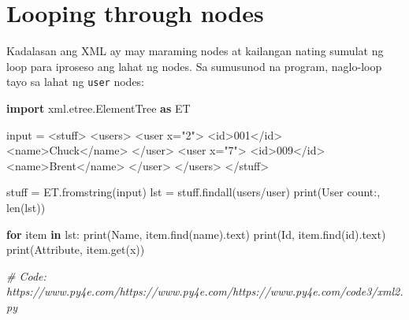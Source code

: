 \documentclass[10pt,]{book}
\newenvironment{Shaded}{}{}
\newcommand{\BuiltInTok}[1]{\textcolor[rgb]{0.00,0.50,0.00}{#1}}
\newcommand{\CommentTok}[1]{\textcolor[rgb]{0.38,0.63,0.69}{\textit{#1}}}
\newcommand{\ControlFlowTok}[1]{\textcolor[rgb]{0.00,0.44,0.13}{\textbf{#1}}}
\newcommand{\ImportTok}[1]{\textcolor[rgb]{0.00,0.50,0.00}{\textbf{#1}}}
\newcommand{\KeywordTok}[1]{\textcolor[rgb]{0.00,0.44,0.13}{\textbf{#1}}}
\newcommand{\NormalTok}[1]{#1}
\newcommand{\OperatorTok}[1]{\textcolor[rgb]{0.40,0.40,0.40}{#1}}
\newcommand{\StringTok}[1]{\textcolor[rgb]{0.25,0.44,0.63}{#1}}
\begin{document}
\section{Looping through nodes}\label{looping-through-nodes}

 

Kadalasan ang XML ay may maraming nodes at kailangan nating sumulat ng
loop para iproseso ang lahat ng nodes. Sa sumusunod na program,
naglo-loop tayo sa lahat ng \texttt{user} nodes:

\begin{Shaded}
\begin{Highlighting}[]
\ImportTok{import}\NormalTok{ xml.etree.ElementTree }\ImportTok{as}\NormalTok{ ET}

\BuiltInTok{input} \OperatorTok{=} \StringTok{\textquotesingle{}\textquotesingle{}\textquotesingle{}}
\StringTok{\textless{}stuff\textgreater{}}
\StringTok{  \textless{}users\textgreater{}}
\StringTok{    \textless{}user x="2"\textgreater{}}
\StringTok{      \textless{}id\textgreater{}001\textless{}/id\textgreater{}}
\StringTok{      \textless{}name\textgreater{}Chuck\textless{}/name\textgreater{}}
\StringTok{    \textless{}/user\textgreater{}}
\StringTok{    \textless{}user x="7"\textgreater{}}
\StringTok{      \textless{}id\textgreater{}009\textless{}/id\textgreater{}}
\StringTok{      \textless{}name\textgreater{}Brent\textless{}/name\textgreater{}}
\StringTok{    \textless{}/user\textgreater{}}
\StringTok{  \textless{}/users\textgreater{}}
\StringTok{\textless{}/stuff\textgreater{}\textquotesingle{}\textquotesingle{}\textquotesingle{}}

\NormalTok{stuff }\OperatorTok{=}\NormalTok{ ET.fromstring(}\BuiltInTok{input}\NormalTok{)}
\NormalTok{lst }\OperatorTok{=}\NormalTok{ stuff.findall(}\StringTok{\textquotesingle{}users/user\textquotesingle{}}\NormalTok{)}
\BuiltInTok{print}\NormalTok{(}\StringTok{\textquotesingle{}User count:\textquotesingle{}}\NormalTok{, }\BuiltInTok{len}\NormalTok{(lst))}

\ControlFlowTok{for}\NormalTok{ item }\KeywordTok{in}\NormalTok{ lst:}
    \BuiltInTok{print}\NormalTok{(}\StringTok{\textquotesingle{}Name\textquotesingle{}}\NormalTok{, item.find(}\StringTok{\textquotesingle{}name\textquotesingle{}}\NormalTok{).text)}
    \BuiltInTok{print}\NormalTok{(}\StringTok{\textquotesingle{}Id\textquotesingle{}}\NormalTok{, item.find(}\StringTok{\textquotesingle{}id\textquotesingle{}}\NormalTok{).text)}
    \BuiltInTok{print}\NormalTok{(}\StringTok{\textquotesingle{}Attribute\textquotesingle{}}\NormalTok{, item.get(}\StringTok{\textquotesingle{}x\textquotesingle{}}\NormalTok{))}

\CommentTok{\# Code: https://www.py4e.com/https://www.py4e.com/https://www.py4e.com/code3/xml2.py}
\end{Highlighting}
\end{Shaded}
\end{document}
